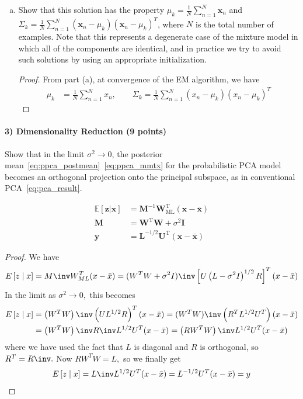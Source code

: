 \documentclass{article}
\begin{document}
\begin{enumerate}[(a)]
	\item Show that this solution has the property $\mu_k=\frac{1}{N}\sum_{n=1}^{N}\mathbf{x}_n$ and $\Sigma_k=\frac{1}{N}\sum_{n=1}^{N}(\mathbf{x}_n-\mu_k)(\mathbf{x}_n-\mu_k)^T$, where $N$ is the total number of examples. Note that this represents a degenerate case of the mixture model in which all of the components are identical, and in practice we try to avoid such solutions by using an appropriate initialization.
		\begin{proof}
			From part (a), at convergence of the EM algorithm, we have
			\begin{align*}
				\mu_k &= \frac{1}{N}\sum_{n=1}^{N} x_n, \quad\quad \Sigma_k = \frac{1}{N} \sum_{n=1}^{N} \left( x_n-\mu_k \right)\left( x_n-\mu_k \right)^T
			\end{align*}
		\end{proof}

\end{enumerate}

\newpage
\paragraph{3) Dimensionality Reduction (9 points)}

Show that in the limit $\sigma^2 \rightarrow 0$, the posterior mean~\eqref{eq:ppca_postmean}~\eqref{eq:ppca_mmtx} for the probabilistic PCA model becomes an orthogonal projection onto the principal subspace, as in conventional PCA~\eqref{eq:pca_result}.

\begin{align}
\mathbb{E}[\mathbf{z}\vert\mathbf{x}] &= \mathbf{M}^{-1}\mathbf{W}_{\mathrm{ML}}^{\mathrm{T}} (\mathbf{x} - \bar{\mathbf{x}})
\label{eq:ppca_postmean} \\
\mathbf{M} &= \mathbf{W}^{\mathrm{T}} \mathbf{W} + \sigma^2 \mathbf{I}
\label{eq:ppca_mmtx} \\
\mathbf{y} &= \mathbf{L}^{-1/2} \mathbf{U}^{\mathrm{T}} (\mathbf{x} - \bar{\mathbf{x}})
\label{eq:pca_result}
\end{align}
	
\begin{proof}
	We have
	\begin{align*}
		E\left[ z\mid x \right] = M\inv W_{ML}^T(x-\bar x) = (W^TW+\sigma^2I)\inv \left[ U\left(L-\sigma^2 I\right)^{1/2} R \right]^T(x-\bar x)
	\end{align*}
	In the limit as $\sigma^2\to 0,$ this becomes
	\begin{align*}
		E\left[ z\mid x \right] &= \left( W^TW \right)\inv \left( U L^{1/2} R \right)^T(x-\bar x) = (W^TW)\inv \left( R^T L^{1/2} U^T \right)(x-\bar x) \\
		&= \left( W^TW \right)\inv R\inv L^{1/2} U^T(x-\bar x) = \left( RW^TW \right)\inv L^{1/2} U^T(x-\bar x)
	\end{align*}
	where we have used the fact that $L$ is diagonal and $R$ is orthogonal, so $R^T=R\inv.$ Now $RW^TW=L,$ so we finally get
	\begin{align*}
		E\left[ z\mid x \right] = L\inv L^{1/2} U^T(x-\bar x) = L^{-1/2}U^T (x-\bar x) = y
	\end{align*}
\end{proof}
\end{document}

